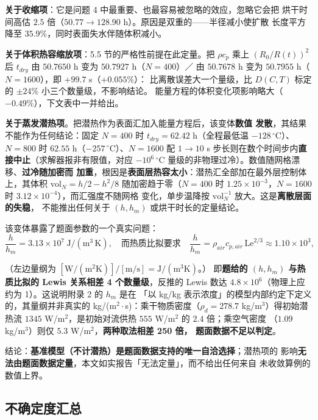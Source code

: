 \textbf{关于收缩项}：它是问题 4 中最重要、也最容易被忽略的效应，忽略它会把
烘干时间高估 $2.5$ 倍（$50.77\to128.90$ h）。原因是双重的——半径减小使扩散
长度平方降至 $35.9\%$，同时表面失水伴随体积减小。

\textbf{关于体积热容缩放项}：5.5 节的严格性前提在此定量。把 $\rho c_p$ 乘上
$(R_0/R(t))^2$ 后 $t_{dry}$ 由 $50.7650$ h 变为 $50.7927$ h（$N=400$）／
由 $50.7678$ h 变为 $50.7955$ h（$N=1600$），即 $+99.7$ s（$+0.055\%$）：
比离散误差大一个量级，比 $D(C,T)$ 标定的 $\pm24\%$ 小三个数量级，不影响结论。
能量方程的体积变化项影响略大（$-0.49\%$），下文表中一并给出。

\textbf{关于蒸发潜热项}。把潜热作为表面汇加入能量方程后，该变体\textbf{数值
发散}，其结果不能作为任何结论：固定 $N=400$ 时 $t_{dry}=62.42$ h（全程最低温
$-128\,^\circ$C）、$N=800$ 时 $62.55$ h（$-257\,^\circ$C）、$N=1600$ 配
$1\to10$ s 步长则在数个时间步内\textbf{直接中止}（求解器报非有限值，对应
$-10^{6}\,^\circ$C 量级的非物理过冷）。数值随网格漂移、\textbf{过冷随加密而
加重}，根因是\textbf{表面层热容太小}：潜热汇全部加在最外层控制体上，其体积
$\mathrm{vol}_N=h/2-h^2/8$ 随加密趋于零（$N=400$ 时
$1.25\times10^{-3}$，$N=1600$ 时 $3.12\times10^{-4}$），而汇强度不随网格
变化，单步温降按 $\mathrm{vol}_N^{-1}$ 放大。这是\textbf{离散层面的失稳}，
不能推出任何关于 $(h,h_m)$ 或烘干时长的定量结论。

该变体暴露了题面参数的一个真实问题：
\begin{equation}
\frac{h}{h_m}=3.13\times10^{7}\ \mathrm{J/(m^3\,K)},
\quad\text{而热质比拟要求}\quad
\frac{h}{h_m}=\rho_{air}c_{p,air}\,\mathrm{Le}^{2/3}\approx1.10\times10^{3},
\label{eq:lewis}
\end{equation}

（左边量纲为 $[\mathrm{W/(m^2K)}]/[\mathrm{m/s}]=\mathrm{J/(m^3K)}$。）
即\textbf{题给的 $(h,h_m)$ 与热质比拟的 Lewis 关系相差 4 个数量级}，反推的
Lewis 数达 $4.8\times10^{6}$（物理上应约为 1）。这说明附录 2 的 $h_m$ 是在
「以 kg/kg 表示浓度」的模型内部约定下定义的，其量纲并非真实的
kg/(m$^2\cdot$s)：乘干物质密度（$\rho_d=278.7$ kg/m$^3$）得初始潜热流
$1345$ W/m$^2$，是初始对流供热 $555$ W/m$^2$ 的 $2.4$ 倍；乘空气密度
（$1.09$ kg/m$^3$）则仅 $5.3$ W/m$^2$，\textbf{两种取法相差 250 倍，
题面数据不足以判定}。

结论：\textbf{基准模型（不计潜热）是题面数据支持的唯一自洽选择}；潜热项的
影响\textbf{无法由题面数据定量}，本文如实报告「无法定量」，而不给出任何来自
未收敛算例的数值上界。
\subsection{不确定度汇总}


